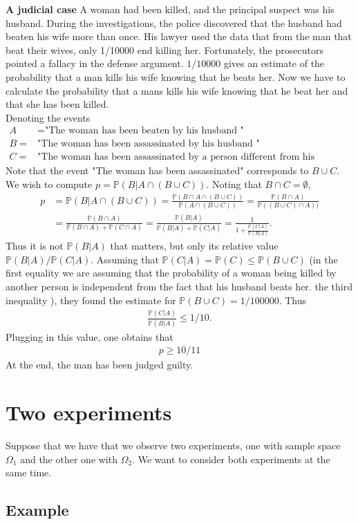\documentclass[12pt]{article}
\newcommand{\<}{{\langle \!\! \langle}}
\renewcommand{\>}{{\rangle \!\! \rangle}}
\newcommand{\bel}[2]{\begin{equation} \label{#1} \begin{split} #2
 					\end{split} \end{equation}}
\begin{document}
\textbf{A judicial case} A woman had been killed, and the principal suspect was his husband. During the investigations, the police discovered that the husband had beaten his wife more than once. His lawyer used the data that from the man that beat their wives, only 1/10000 end killing her. Fortunately, the prosecutors pointed a fallacy in the defense argument. $1/10000$ gives an estimate of the probability that a man kills his wife knowing that he beats her. Now we have to calculate the probability that a mans kills his wife knowing that he beat her and that she has been killed.\\
Denoting the events
\bel{}{
A &=\textrm{"The woman has been beaten by his husband  "}\\ B=&\textrm{"The woman has been assassinated by his husband  "} \\ C=&\textrm{"The woman has been assassinated by a person different from his husband "}}
Note that the event "The woman has been assassinated" corresponds to $B\cup C$. We wish to compute 
$p=\mathbb{P}(B\vert A\cap(B\cup C))$. Noting that $B\cap C=\emptyset,$
\bel{}{p& =\mathbb{P}(B\vert A\cap(B\cup C))=\frac{\mathbb{P}(B\cap A\cap (B\cup C))}{\mathbb{P}(A\cap (B\cup C))}=\frac{\mathbb{P}(B\cap A)}{\mathbb{P}((B\cup C)\cap A))}\\
 &=\frac{\mathbb{P}(B\cap A)}{\mathbb{P}(B\cap A)+\mathbb{P}(C\cap A)}=\frac{\mathbb{P}(B|A)}{\mathbb{P}(B|A)+\mathbb{P}(C|A)}=\frac{1}{1+\frac{\mathbb{P}(C|A)}{\mathbb{P}(B|A)}}.}
Thus it is not $\mathbb{P}(B|A)$ that matters, but only its relative value $\mathbb{P}(B|A)/\mathbb{P}(C|A)$. Assuming that $\mathbb{P}(C|A)=\mathbb{P}(C)\leq \mathbb{P}(B\cup C)$ (in the first equality we are assuming that the probability of a woman being killed by another person is independent from the fact that his husband beats her. the third inequality ), they found the estimate for $\mathbb{P}(B\cup C)=1/100000$. Thus \bel{}{\frac{\mathbb{P}(C|A)}{\mathbb{P}(B|A)}\leq 1/10.}
Plugging in this value, one obtains that
\bel{}{p\geq 10/11}
At the end, the man has been judged guilty. 
\section{Two experiments}

Suppose that we have that we observe two experiments, one with sample space $\Omega_1$ and the other one with $\Omega_2$. We want to consider both experiments at the same time. 

\subsection{ Example}
\end{document}
